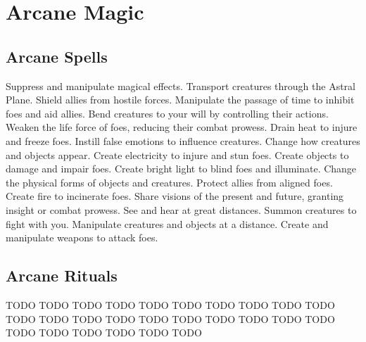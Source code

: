 \small
\section{Arcane Magic}\label{Arcane Magic}
\subsection{Arcane Spells}\label{Arcane Spells}
\begin{spelllist}
 Suppress and manipulate magical effects.
 Transport creatures through the Astral Plane.
 Shield allies from hostile forces.
 Manipulate the passage of time to inhibit foes and aid allies.
 Bend creatures to your will by controlling their actions.
 Weaken the life force of foes, reducing their combat prowess.
 Drain heat to injure and freeze foes.
 Instill false emotions to influence creatures.
 Change how creatures and objects appear.
 Create electricity to injure and stun foes.
 Create objects to damage and impair foes.
 Create bright light to blind foes and illuminate.
 Change the physical forms of objects and creatures.
 Protect allies from aligned foes.
 Create fire to incinerate foes.
 Share visions of the present and future, granting insight or combat prowess.
 See and hear at great distances.
 Summon creatures to fight with you.
 Manipulate creatures and objects at a distance.
 Create and manipulate weapons to attack foes.
\end{spelllist}
\subsection{Arcane Rituals}\label{Arcane Rituals}
\begin{spelllist}
 TODO
 TODO
 TODO
 TODO
 TODO
 TODO
 TODO
 TODO
 TODO
 TODO
 TODO
 TODO
 TODO
 TODO
 TODO
 TODO
 TODO
 TODO
 TODO
 TODO
 TODO
 TODO
 TODO
 TODO
 TODO
 TODO
\end{spelllist}
\small
